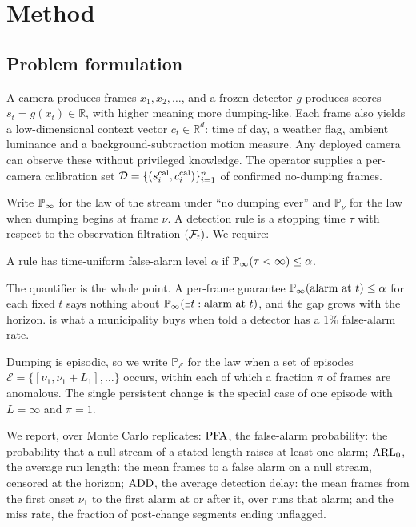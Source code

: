 \section{Method}
\label{sec:method}

\subsection{Problem formulation}
\label{sec:problem}

A camera produces frames $x_1, x_2, \ldots$, and a frozen detector $g$ produces scores $s_t = g(x_t) \in \mathbb{R}$, with higher meaning more dumping-like. Each frame also yields a low-dimensional context vector $c_t \in \mathbb{R}^d$: time of day, a weather flag, ambient luminance and a background-subtraction motion measure. Any deployed camera can observe these without privileged knowledge. The operator supplies a per-camera calibration set $\mathcal{D} = \{(s_i^{\mathrm{cal}}, c_i^{\mathrm{cal}})\}_{i=1}^{n}$ of confirmed no-dumping frames.

Write $\mathbb{P}_{\infty}$ for the law of the stream under ``no dumping ever'' and $\mathbb{P}_{\nu}$ for the law when dumping begins at frame $\nu$. A detection rule is a stopping time $\tau$ with respect to the observation filtration $(\mathcal{F}_t)$. We require:

\begin{definition}
\label{def:tuv}
A rule has time-uniform false-alarm level $\alpha$ if
$\mathbb{P}_{\infty}(\tau < \infty) \le \alpha$.
\end{definition}

The quantifier is the whole point. A per-frame guarantee $\mathbb{P}_{\infty}(\text{alarm at } t) \le \alpha$ for each fixed $t$ says nothing about $\mathbb{P}_{\infty}(\exists t : \text{alarm at } t)$, and the gap grows with the horizon.  is what a municipality buys when told a detector has a $1\%$ false-alarm rate.

Dumping is episodic, so we write $\mathbb{P}_{\mathcal{E}}$ for the law when a set of episodes $\mathcal{E} = \{[\nu_1, \nu_1 + L_1], \ldots\}$ occurs, within each of which a fraction $\pi$ of frames are anomalous. The single persistent change is the special case of one episode with $L = \infty$ and $\pi = 1$.

We report, over Monte Carlo replicates: $\mathrm{PFA}$, the false-alarm probability: the probability that a null stream of a stated length raises at least one alarm; $\mathrm{ARL}_0$, the average run length: the mean frames to a false alarm on a null stream, censored at the horizon; $\mathrm{ADD}$, the average detection delay: the mean frames from the first onset $\nu_1$ to the first alarm at or after it, over runs that alarm; and the miss rate, the fraction of post-change segments ending unflagged.

